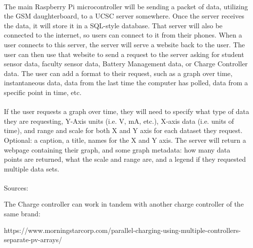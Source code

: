 \paragraph{}
The main Raspberry Pi microcontroller will be sending a packet of data, utilizing the GSM daughterboard, to a UCSC server somewhere. Once the server receives the data, it will store it in a SQL-style database. That server will also be connected to the internet, so users can connect to it from their phones. When a user connects to this server, the server will serve a website back to the user. The user can then use that website to send a request to the server asking for student sensor data, faculty sensor data, Battery Management data, or Charge Controller data. The user can add a format to their request, such as a graph over time, instantaneous data, data from the last time the computer has polled, data from a specific point in time, etc.
\paragraph{}
If the user requests a graph over time, they will need to specify what type of data they are requesting, Y-Axis units (i.e. V, mA, etc.), X-axis data (i.e. units of time), and range and scale for both X and Y axis for each dataset they request. Optional: a caption, a title, names for the X and Y axis. The server will return a webpage containing their graph, and some graph metadata: how many data points are returned, what the scale and range are, and a legend if they requested multiple data sets. 
\paragraph{}
Sources:

The Charge controller can work in tandem with another charge controller of the same brand:

https://www.morningstarcorp.com/parallel-charging-using-multiple-controllers-separate-pv-arrays/










